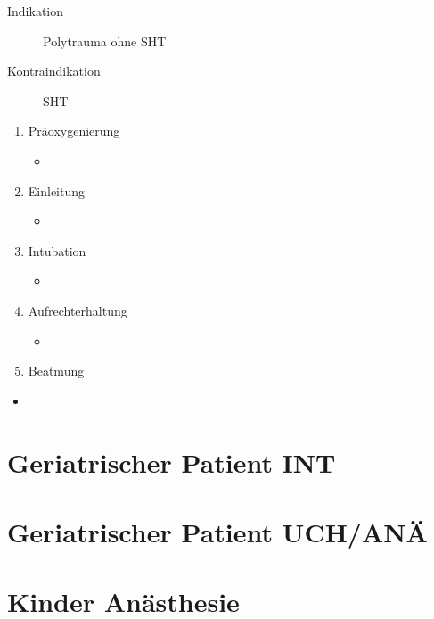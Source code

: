 {%
\begin{description}
  \item[Indikation] Polytrauma ohne SHT
  \item[Kontraindikation] SHT
\end{description}
\begin{enumerate}
  \item Präoxygenierung
  \begin{itemize}
    \item
  \end{itemize}
  \item Einleitung
  \begin{itemize}
    \item
  \end{itemize}
  \item Intubation
  \begin{itemize}
    \item
  \end{itemize}
  \item Aufrechterhaltung
  \begin{itemize}
    \item
  \end{itemize}
  \item Beatmung
\end{enumerate}
}
{%
\begin{itemize}
  \item 
\end{itemize}
}



\clearpage
\section{Geriatrischer Patient INT}

\clearpage
\section{Geriatrischer Patient UCH/ANÄ}

\clearpage
\section{Kinder Anästhesie}

